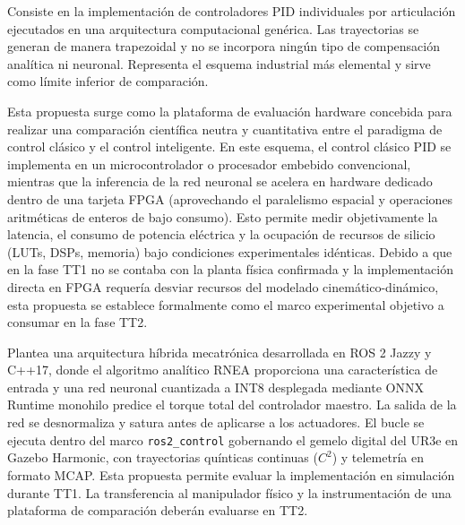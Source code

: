 \documentclass[12pt]{article}
\begin{document}
\begin{description}[style=unboxed,leftmargin=0em]
    \item[\textbf{Propuesta A (Control Clásico Desacoplado en Entorno Estándar):}]
    Consiste en la implementación de controladores PID individuales por articulación ejecutados en una arquitectura computacional genérica. Las trayectorias se generan de manera trapezoidal y no se incorpora ningún tipo de compensación analítica ni neuronal. Representa el esquema industrial más elemental y sirve como límite inferior de comparación.
    
    \item[\textbf{Propuesta B (Plataforma Neutra de Comparación Hardware -- Microcontrolador vs. FPGA):}]
    Esta propuesta surge como la plataforma de evaluación hardware concebida para realizar una comparación científica neutra y cuantitativa entre el paradigma de control clásico y el control inteligente. En este esquema, el control clásico PID se implementa en un microcontrolador o procesador embebido convencional, mientras que la inferencia de la red neuronal se acelera en hardware dedicado dentro de una tarjeta FPGA (aprovechando el paralelismo espacial y operaciones aritméticas de enteros de bajo consumo). Esto permite medir objetivamente la latencia, el consumo de potencia eléctrica y la ocupación de recursos de silicio (LUTs, DSPs, memoria) bajo condiciones experimentales idénticas. Debido a que en la fase TT1 no se contaba con la planta física confirmada y la implementación directa en FPGA requería desviar recursos del modelado cinemático-dinámico, esta propuesta se establece formalmente como el marco experimental objetivo a consumar en la fase TT2.
    
    \item[\textbf{Propuesta C (Arquitectura Híbrida Cuantizada en Sim-to-Real -- Solución Seleccionada para TT1):}]
    Plantea una arquitectura híbrida mecatrónica desarrollada en ROS 2 Jazzy y C++17, donde el algoritmo analítico RNEA proporciona una característica de entrada y una red neuronal cuantizada a INT8 desplegada mediante ONNX Runtime monohilo predice el torque total del controlador maestro. La salida de la red se desnormaliza y satura antes de aplicarse a los actuadores. El bucle se ejecuta dentro del marco \texttt{ros2\_control} gobernando el gemelo digital del UR3e en Gazebo Harmonic, con trayectorias quínticas continuas ($C^2$) y telemetría en formato MCAP. Esta propuesta permite evaluar la implementación en simulación durante TT1. La transferencia al manipulador físico y la instrumentación de una plataforma de comparación deberán evaluarse en TT2.
\end{description}
\end{document}

